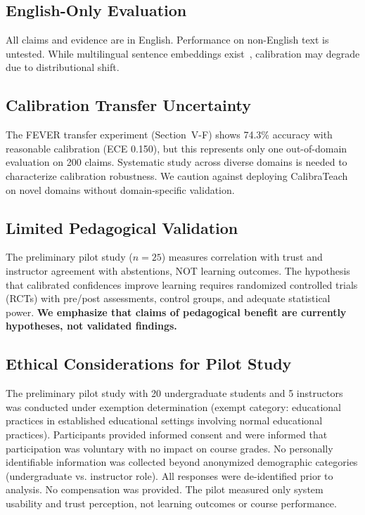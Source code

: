 \documentclass[journal]{IEEEtran}
\begin{document}
\subsection{English-Only Evaluation}

All claims and evidence are in English. Performance on non-English text is untested. While multilingual sentence embeddings exist~\cite{Reimers2020}, calibration may degrade due to distributional shift.

\subsection{Calibration Transfer Uncertainty}

The FEVER transfer experiment (Section~V-F) shows 74.3\% accuracy with reasonable calibration (ECE 0.150), but this represents only one out-of-domain evaluation on 200 claims. Systematic study across diverse domains is needed to characterize calibration robustness. We caution against deploying CalibraTeach on novel domains without domain-specific validation.

\subsection{Limited Pedagogical Validation}

The preliminary pilot study ($n=25$) measures correlation with trust and instructor agreement with abstentions, NOT learning outcomes. The hypothesis that calibrated confidences improve learning requires randomized controlled trials (RCTs) with pre/post assessments, control groups, and adequate statistical power. \textbf{We emphasize that claims of pedagogical benefit are currently hypotheses, not validated findings.}

\subsection{Ethical Considerations for Pilot Study}

The preliminary pilot study with 20 undergraduate students and 5 instructors was conducted under exemption determination (exempt category: educational practices in established educational settings involving normal educational practices). Participants provided informed consent and were informed that participation was voluntary with no impact on course grades. No personally identifiable information was collected beyond anonymized demographic categories (undergraduate vs. instructor role). All responses were de-identified prior to analysis. No compensation was provided. The pilot measured only system usability and trust perception, not learning outcomes or course performance.
\end{document}
